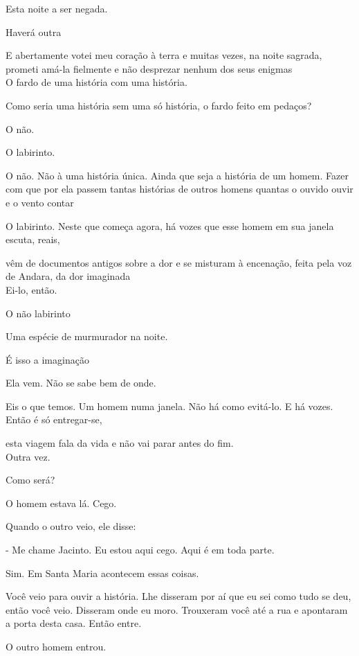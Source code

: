 Esta noite a ser negada.

Haverá outra

E abertamente votei meu coração à terra e muitas vezes, na noite
sagrada, prometi amá-la fielmente e não desprezar nenhum dos seus
enigmas\\

O fardo de uma história com uma história.

Como seria uma história sem uma só história, o fardo feito em pedaços?

O não.

O labirinto.

O não. Não à uma história única. Ainda que seja a história de um homem.
Fazer com que por ela passem tantas histórias de outros homens quantas o
ouvido ouvir e o vento contar

O labirinto. Neste que começa agora, há vozes que esse homem em sua
janela escuta, reais,

vêm de documentos antigos sobre a dor e se misturam à encenação, feita
pela voz de Andara, da dor imaginada\\

Ei-lo, então.

O não labirinto

\pagebreak

Uma espécie de murmurador na noite.

É isso a imaginação

Ela vem. Não se sabe bem de onde.

Eis o que temos. Um homem numa janela. Não há como evitá-lo. E há vozes.
Então é só entregar-se,

esta viagem fala da vida e não vai parar antes do fim.\\

Outra vez.

Como será?

\pagebreak

O homem estava lá. Cego.

Quando o outro veio, ele disse:

- Me chame Jacinto. Eu estou aqui cego. Aqui é em toda parte.

Sim. Em Santa Maria acontecem essas coisas.

Você veio para ouvir a história. Lhe disseram por aí que eu sei como
tudo se deu, então você veio. Disseram onde eu moro. Trouxeram você até
a rua e apontaram a porta desta casa. Então entre.

O outro homem entrou.

